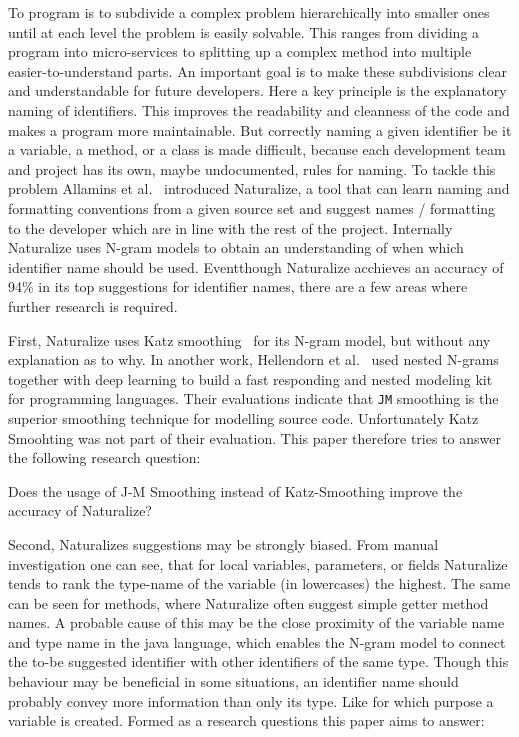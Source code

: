 To program is to subdivide a complex problem hierarchically into smaller ones until at each level the problem is easily solvable. This ranges from dividing a program into micro-services to splitting up a complex method into multiple easier-to-understand parts.
An important goal is to make these subdivisions clear and understandable for future developers. Here a key principle is the explanatory naming of identifiers. This improves the readability and cleanness of the code and makes a program more maintainable. But correctly naming a given identifier be it a variable, a method, or a class is made difficult, because each development team and project has its own, maybe undocumented, rules for naming. To tackle this problem Allamins et al.~\cite{naturalize} introduced Naturalize, a tool that can learn naming and formatting conventions from a given source set and suggest names / formatting to the developer which are in line with the rest of the project. Internally Naturalize uses N-gram models to obtain an understanding of when which identifier name should be used. Eventthough Naturalize acchieves an accuracy of 94\% in its top suggestions for identifier names, there are a few areas where further research is required.

First, Naturalize uses Katz smoothing~\cite{naturalize} for its N-gram model, but without any explanation as to why. In another work, Hellendorn et al.~\cite{nestedngram} used nested N-grams together with deep learning to build a fast responding and nested modeling kit for programming languages. Their evaluations indicate that \texttt{JM} smoothing is the superior smoothing technique for modelling source code. Unfortunately Katz Smoohting was not part of their evaluation. This paper therefore tries to answer the following research question:

\begin{resquest} \label{hyp:jmsmoothing}
Does the usage of J-M Smoothing instead of Katz-Smoothing improve the accuracy of Naturalize?
\end{resquest}

Second, Naturalizes suggestions may be strongly biased. From manual investigation one can see, that for local variables, parameters, or fields Naturalize tends to rank the type-name of the variable (in lowercases) the highest. The same can be seen for methods, where Naturalize often suggest simple getter method names. A probable cause of this may be the close proximity of the variable name and type name in the java language, which enables the N-gram model to connect the to-be suggested identifier with other identifiers of the same type. Though this behaviour may be beneficial in some situations, an identifier name should probably convey more information than only its type. Like for which purpose a variable is created. Formed as a research questions this paper aims to answer:

